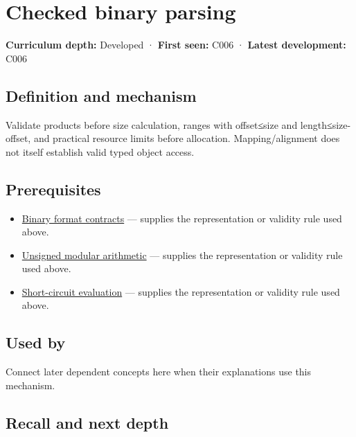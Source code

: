 \hypertarget{appendix-652d81568de9}{}
\section{Checked binary parsing}\label{appendix-652d81568de9-checked-binary-parsing}

\textbf{Curriculum depth:} Developed · \textbf{First seen:} C006 · \textbf{Latest development:} C006

\subsection{Definition and mechanism}\label{appendix-652d81568de9-definition-and-mechanism}

Validate products before size calculation, ranges with offset≤size and length≤size-offset, and practical resource limits before allocation. Mapping/alignment does not itself establish valid typed object access.

\subsection{Prerequisites}\label{appendix-652d81568de9-prerequisites}

\begin{itemize}
\tightlist
\item
  \hyperref[appendix-590bbb2424c1]{Binary format contracts} --- supplies the representation or validity rule used above.
\item
  \hyperref[appendix-c99977d88b33]{Unsigned modular arithmetic} --- supplies the representation or validity rule used above.
\item
  \hyperref[appendix-2e245a6fa8d3]{Short-circuit evaluation} --- supplies the representation or validity rule used above.
\end{itemize}

\subsection{Used by}\label{appendix-652d81568de9-used-by}

Connect later dependent concepts here when their explanations use this mechanism.

\subsection{Recall and next depth}\label{appendix-652d81568de9-recall-and-next-depth}

